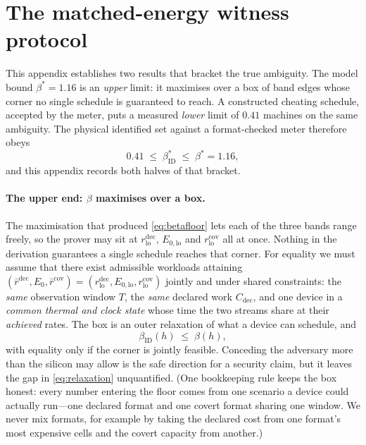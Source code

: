 \documentclass{article}
\theoremstyle{plain}
\theoremstyle{definition}
\theoremstyle{remark}
\begin{document}
\section{The matched-energy witness protocol}
\label{app:boundkind}
\label{app:witness}

This appendix establishes two results that bracket the true ambiguity.
The model bound $\beta^{*} = 1.16$ is an \emph{upper} limit: it maximises
over a box of band edges whose corner no single schedule is guaranteed to
reach. A constructed cheating schedule, accepted by the meter, puts a
measured \emph{lower} limit of $0.41$ machines on the same ambiguity. The
physical identified set against a format-checked meter therefore obeys
\begin{equation}
	0.41 \;\leq\; \beta_{\mathrm{ID}}^{*} \;\leq\; \beta^{*} = 1.16,
	\label{eq:ambiguity-bracket}
\end{equation}
and this appendix records both
halves of that bracket.

\paragraph{The upper end: $\beta$ maximises over a box.}
The maximisation that produced \cref{eq:betafloor} lets each of the three
bands range freely, so the prover may sit at
$r_{\mathrm{lo}}^{\mathrm{dec}}$, $E_{0,\mathrm{lo}}$ and
$r_{\mathrm{lo}}^{\mathrm{cov}}$ all at once. Nothing in the derivation
guarantees a single schedule reaches that corner. For equality we must
assume that there exist admissible workloads attaining
$(\bar r^{\mathrm{dec}}, E_0, \bar r^{\mathrm{cov}}) =
(r_{\mathrm{lo}}^{\mathrm{dec}}, E_{0,\mathrm{lo}}, r_{\mathrm{lo}}^{\mathrm{cov}})$
jointly and under shared constraints: the \emph{same} observation window $T$,
the \emph{same} declared work $C_{\mathrm{dec}}$, and one device in a
\emph{common thermal and clock state} whose time the two streams share
at their \emph{achieved} rates. The box is
an outer relaxation of what a device can schedule, and
\begin{equation}
	\beta_{\mathrm{ID}}(h) \;\le\; \beta(h),
	\label{eq:relaxation}
\end{equation}
with equality only if the corner is jointly feasible. Conceding the adversary more
than the silicon may allow is the safe direction for a security claim,
but it leaves the gap in \cref{eq:relaxation} unquantified. (One
bookkeeping rule keeps the box honest: every number entering the floor
comes from one scenario a device could actually run---one declared format
and one covert format sharing one window. We never mix formats, for
example by taking the declared cost from one format's most expensive
cells and the covert capacity from another.)
\end{document}
